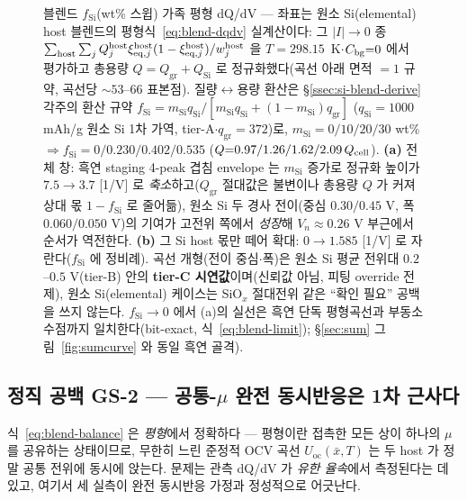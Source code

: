 \begin{figure}[t]
\caption{블렌드 $f_\mathrm{Si}$(wt\% 스윕) 가족 평형 dQ/dV --- 좌표는 원소 Si(elemental) host 블렌드의
평형식~\eqref{eq:blend-dqdv} 실계산이다:
그 $|I|\!\to\!0$ 종
$\sum_{\mathrm{host}}\sum_j Q_j^\mathrm{host}\xi_{\mathrm{eq},j}^\mathrm{host}(1-\xi_{\mathrm{eq},j}^\mathrm{host})/w_j^\mathrm{host}$
을 $T{=}298.15$~K$\cdot$$C_{\mathrm{bg}}{=}0$ 에서 평가하고 총용량 $Q{=}Q_\mathrm{gr}{+}Q_\mathrm{Si}$ 로
정규화했다(곡선 아래 면적 $=1$ 규약, 곡선당 $\sim$$53$--$66$ 표본점). 질량$\leftrightarrow$용량 환산은
§\ref{ssec:si-blend-derive} 각주의 환산 규약
$f_\mathrm{Si}=m_\mathrm{Si}q_\mathrm{Si}/[m_\mathrm{Si}q_\mathrm{Si}+(1{-}m_\mathrm{Si})q_\mathrm{gr}]$
($q_\mathrm{Si}{=}1000$ mAh/g 원소 Si 1차 가역\cite{limthongkul2003}, tier-A$\cdot$$q_\mathrm{gr}{=}372$)로,
$m_\mathrm{Si}{=}0/10/20/30$ wt\% $\Rightarrow f_\mathrm{Si}{=}0/0.230/0.402/0.535$
($Q{=}0.97/1.26/1.62/2.09\,Q_{\mathrm{cell}}$). \textbf{(a)} 전체 창: 흑연 staging 4-peak 겹침 envelope 는
$m_\mathrm{Si}$ 증가로 정규화 높이가 $7.5\!\to\!3.7$ [1/V] 로 \emph{축소}하고($Q_\mathrm{gr}$ 절대값은
불변이나 총용량 $Q$ 가 커져 상대 몫 $1{-}f_\mathrm{Si}$ 로 줄어듦), 원소 Si 두 경사 전이(중심 $0.30/0.45$
V, 폭 $0.060/0.050$ V)의 기여가 고전위 쪽에서 \emph{성장}해 $V_n\!\approx\!0.26$ V 부근에서 순서가
역전한다. \textbf{(b)} 그 Si host 몫만 떼어 확대: $0\!\to\!1.585$
[1/V] 로 자란다($f_\mathrm{Si}$ 에 정비례). 곡선 개형(전이 중심$\cdot$폭)은 원소 Si 평균 전위대
$0.2$--$0.5$ V\cite{obrovac_chevrier2014}(tier-B) 안의 \textbf{tier-C 시연값}이며(신뢰값 아님, 피팅
override 전제), 원소 Si(elemental) 케이스는 SiO$_x$ 절대전위 같은 ``확인 필요'' 공백을 쓰지 않는다.
$f_\mathrm{Si}\!\to\!0$ 에서 (a)의 실선은 흑연 단독 평형곡선과 부동소수점까지 일치한다(bit-exact,
식~\eqref{eq:blend-limit}); \S\ref{sec:sum} 그림~\ref{fig:sumcurve} 와 동일 흑연 골격).}
\label{fig:blend-family}
\end{figure}


\subsection{정직 공백 GS-2 --- 공통-$\mu$ 완전 동시반응은 1차 근사다}\label{ssec:si-blend-gs2}
식~\eqref{eq:blend-balance} 은 \emph{평형}에서 정확하다 --- 평형이란 접촉한 모든 상이 하나의 $\mu$ 를
공유하는 상태이므로, 무한히 느린 준정적 OCV 곡선 $U_\mathrm{oc}(\bar x,T)$ 는 두 host 가 정말 공통 전위에
동시에 앉는다. 문제는 관측 dQ/dV 가 \emph{유한 율속}에서 측정된다는 데 있고, 여기서 세 실측이 완전
동시반응 가정과 정성적으로 어긋난다.

